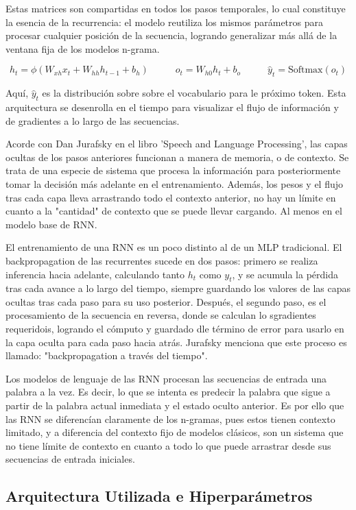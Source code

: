 Estas matrices son compartidas en todos los pasos temporales, lo cual constituye la esencia de la recurrencia: el modelo reutiliza los mismos parámetros para procesar cualquier posición de la secuencia, logrando generalizar más allá de la ventana fija de los modelos n-grama.

\[
h_t = \phi(W_{xh}x_t + W_{hh} h_{t-1} + b_h) \;\;\;\;\;\;\;\;\;\; o_t = W_{h0}h_t + b_{o} \;\;\;\;\;\;\;\;\;\; \hat{y}_t = \text{Softmax}(o_t)
\]

Aquí, $\hat{y}_t$ es la distribución sobre sobre el vocabulario para le próximo token. Esta arquitectura se desenrolla en el tiempo para visualizar el flujo de información y de gradientes a lo largo de las secuencias. 

Acorde con Dan Jurafsky en el libro 'Speech and Language Processing', las  capas ocultas de los pasos anteriores funcionan a manera de memoria, o de contexto. Se trata de una especie de sistema que procesa la información para posteriormente tomar la decisión más adelante en el entrenamiento. Además, los pesos y el flujo tras cada capa lleva arrastrando todo el contexto anterior, no hay un límite en cuanto a la "cantidad" de contexto que se puede llevar cargando. Al menos en el modelo base de RNN. 

El entrenamiento de una RNN es un poco distinto al de un MLP tradicional. El backpropagation de las recurrentes sucede en dos pasos: primero se realiza inferencia hacia adelante, calculando tanto $h_t$ como $y_t$, y se acumula la pérdida tras cada avance a lo largo del tiempo, siempre guardando los valores de las capas ocultas tras cada paso para su uso posterior. Después, el segundo paso, es el procesamiento de la secuencia en reversa, donde se calculan lo sgradientes requeridois, logrando el cómputo y guardado dle término de error para usarlo en la capa oculta para cada paso hacia atrás. Jurafsky menciona que este proceso es llamado: "backpropagation a través del tiempo". 

Los modelos de lenguaje de las RNN procesan las secuencias de entrada una palabra a la vez. Es decir, lo que se intenta es predecir la palabra que sigue a partir de la palabra actual inmediata y el estado oculto anterior. Es por ello que las RNN se diferencían claramente de los n-gramas, pues estos tienen contexto limitado, y a diferencia del contexto fijo de modelos clásicos, son un sistema que no tiene límite de contexto en cuanto a todo lo que puede arrastrar desde sus secuencias de entrada iniciales. 


\subsection{Arquitectura Utilizada e Hiperparámetros}

